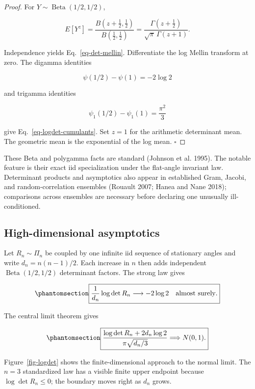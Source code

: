\documentclass[
  english,
  11pt,
  letterpaper,
  DIV=11,
  numbers=noendperiod]{scrartcl}
\theoremstyle{plain}
\theoremstyle{plain}
\theoremstyle{plain}
\theoremstyle{plain}
\theoremstyle{remark}
\begin{document}
\begin{proof}
For \(Y\sim\operatorname{Beta}(1/2,1/2)\),

\[
E[Y^z]
=\frac{B(z+\tfrac12,\tfrac12)}
{B(\tfrac12,\tfrac12)}
=\frac{\Gamma(z+\tfrac12)}
{\sqrt\pi\,\Gamma(z+1)}.
\]

Independence yields Eq.~\ref{eq-det-mellin}. Differentiate the log
Mellin transform at zero. The digamma identities

\[
\psi(1/2)-\psi(1)=-2\log2
\]

and trigamma identities

\[
\psi_1(1/2)-\psi_1(1)=\frac{\pi^2}{3}
\]

give Eq.~\ref{eq-logdet-cumulants}. Set \(z=1\) for the arithmetic
determinant mean. The geometric mean is the exponential of the log mean.
\(\square\)
\end{proof}

These Beta and polygamma facts are standard (Johnson et al. 1995). The
notable feature is their exact iid specialization under the flat-angle
invariant law. Determinant products and asymptotics also appear in
established Gram, Jacobi, and random-correlation ensembles (Rouault
2007; Hanea and Nane 2018); comparisons across ensembles are necessary
before declaring one unusually ill-conditioned.

\subsection{High-dimensional
asymptotics}\label{high-dimensional-asymptotics}

Let \(R_n\sim\Pi_n\) be coupled by one infinite iid sequence of
stationary angles and write \(d_n=n(n-1)/2\). Each increase in \(n\)
then adds independent \(\operatorname{Beta}(1/2,1/2)\) determinant
factors. The strong law gives

\begin{equation}\protect\phantomsection\label{eq-logdet-lln}{
\boxed{
\frac1{d_n}\log\det R_n
\longrightarrow-2\log2
\quad\text{almost surely}.
}
}\end{equation}

The central limit theorem gives

\begin{equation}\protect\phantomsection\label{eq-logdet-clt}{
\boxed{
\frac{\log\det R_n+2d_n\log2}
{\pi\sqrt{d_n/3}}
\Longrightarrow N(0,1).
}
}\end{equation}

Figure~\ref{fig-logdet} shows the finite-dimensional approach to the
normal limit. The \(n=3\) standardized law has a visible finite upper
endpoint because \(\log\det R_n\le0\); the boundary moves right as
\(d_n\) grows.
\end{document}

